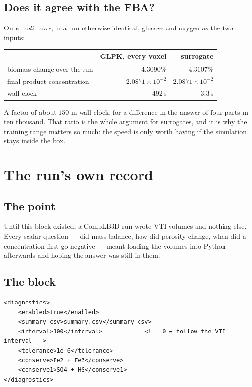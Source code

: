 \section{Does it agree with the FBA?}

On \emph{e\_coli\_core}, in a run otherwise identical, glucose and oxygen as
the two inputs:

\begin{center}
\begin{tabular}{@{}lrr@{}}
\toprule
& \textbf{GLPK, every voxel} & \textbf{surrogate} \\
\midrule
biomass change over the run & $-4.3090\%$ & $-4.3107\%$ \\
final product concentration & $2.0871\times10^{-2}$ & $2.0871\times10^{-2}$ \\
wall clock                  & $492$\,s & $3.3$\,s \\
\bottomrule
\end{tabular}
\end{center}

A factor of about $150$ in wall clock, for a difference in the answer of four
parts in ten thousand. That ratio is the whole argument for surrogates, and it
is why the training range matters so much: the speed is only worth having if
the simulation stays inside the box.

\chapter{The run's own record}
\label{ch:diagnostics}

\section{The point}

Until this block existed, a CompLB3D run wrote VTI volumes and nothing else.
Every scalar question --- did mass balance, how did porosity change, when did a
concentration first go negative --- meant loading the volumes into Python
afterwards and hoping the answer was still in them.

\section{The block}

\begin{lstlisting}[style=xml]
<diagnostics>
    <enabled>true</enabled>
    <summary_csv>summary.csv</summary_csv>
    <interval>100</interval>            <!-- 0 = follow the VTI interval -->
    <tolerance>1e-6</tolerance>
    <conserve>Fe2 + Fe3</conserve>
    <conserve1>SO4 + HS</conserve1>
</diagnostics>
\end{lstlisting}


